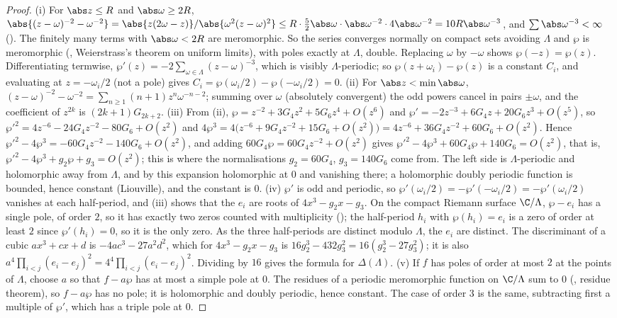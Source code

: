 \begin{proof}
(i) For $\abs z\le R$ and $\abs\omega\ge2R$, $\abs{(z-\omega)^{-2}-\omega^{-2}}=\abs{z(2\omega-z)}/\abs{\omega^2(z-\omega)^2}\le R\cdot\frac52\abs\omega\cdot\abs\omega^{-2}\cdot4\abs\omega^{-2}=10R\abs\omega^{-3}$, and
$\sum\abs\omega^{-3}<\infty$ (). The finitely many terms with $\abs\omega<2R$ are meromorphic. So the series converges normally on compact sets
avoiding $\Lambda$ and $\wp$ is meromorphic (, Weierstrass's theorem on uniform limits), with poles exactly at $\Lambda$, double. Replacing $\omega$ by $-\omega$ shows
$\wp(-z)=\wp(z)$. Differentiating termwise, $\wp'(z)=-2\sum_{\omega\in\Lambda}(z-\omega)^{-3}$, which is visibly $\Lambda$-periodic; so $\wp(z+\omega_i)-\wp(z)$ is a constant $C_i$, and
evaluating at $z=-\omega_i/2$ (not a pole) gives $C_i=\wp(\omega_i/2)-\wp(-\omega_i/2)=0$.
(ii) For $\abs z<\min\abs\omega$, $(z-\omega)^{-2}-\omega^{-2}=\sum_{n\ge1}(n+1)z^n\omega^{-n-2}$; summing over $\omega$ (absolutely convergent) the odd powers cancel in pairs $\pm\omega$, and
the coefficient of $z^{2k}$ is $(2k+1)G_{2k+2}$.
(iii) From (ii), $\wp=z^{-2}+3G_4z^2+5G_6z^4+O(z^6)$ and $\wp'=-2z^{-3}+6G_4z+20G_6z^3+O(z^5)$, so
$\wp'^2=4z^{-6}-24G_4z^{-2}-80G_6+O(z^2)$ and $4\wp^3=4\bigl(z^{-6}+9G_4z^{-2}+15G_6+O(z^2)\bigr)=4z^{-6}+36G_4z^{-2}+60G_6+O(z^2)$. Hence
$\wp'^2-4\wp^3=-60G_4z^{-2}-140G_6+O(z^2)$, and adding $60G_4\wp=60G_4z^{-2}+O(z^2)$ gives $\wp'^2-4\wp^3+60G_4\wp+140G_6=O(z^2)$, that is,
$\wp'^2-4\wp^3+g_2\wp+g_3=O(z^2)$; this is where the normalisations $g_2=60G_4$, $g_3=140G_6$ come from. The left side is $\Lambda$-periodic and
holomorphic away from $\Lambda$, and by this expansion holomorphic at $0$ and vanishing there; a holomorphic doubly periodic function is bounded, hence constant (Liouville), and the
constant is $0$.
(iv) $\wp'$ is odd and periodic, so $\wp'(\omega_i/2)=-\wp'(-\omega_i/2)=-\wp'(\omega_i/2)$ vanishes at each half-period, and (iii) shows that the $e_i$ are roots of
$4x^3-g_2x-g_3$. On the compact Riemann surface $\C/\Lambda$, $\wp-e_i$ has a single pole, of order $2$, so it has exactly two zeros counted with multiplicity (); the
half-period $h_i$ with $\wp(h_i)=e_i$ is a zero of order at least $2$ since $\wp'(h_i)=0$, so it is the only zero. As the three half-periods are distinct modulo $\Lambda$, the $e_i$ are
distinct. The discriminant of a cubic $ax^3+cx+d$ is $-4ac^3-27a^2d^2$, which for $4x^3-g_2x-g_3$ is $16g_2^3-432g_3^2=16(g_2^3-27g_3^2)$; it is also
$a^4\prod_{i<j}(e_i-e_j)^2=4^4\prod_{i<j}(e_i-e_j)^2$. Dividing by $16$ gives the formula for $\Delta(\Lambda)$.
(v) If $f$ has poles of order at most $2$ at the points of $\Lambda$, choose $a$ so that $f-a\wp$ has at most a simple pole at $0$. The residues of a periodic meromorphic function
on $\C/\Lambda$ sum to $0$ (, residue theorem), so $f-a\wp$ has no pole; it is holomorphic and doubly periodic, hence constant. The case of order $3$ is the same,
subtracting first a multiple of $\wp'$, which has a triple pole at $0$.
\end{proof}

